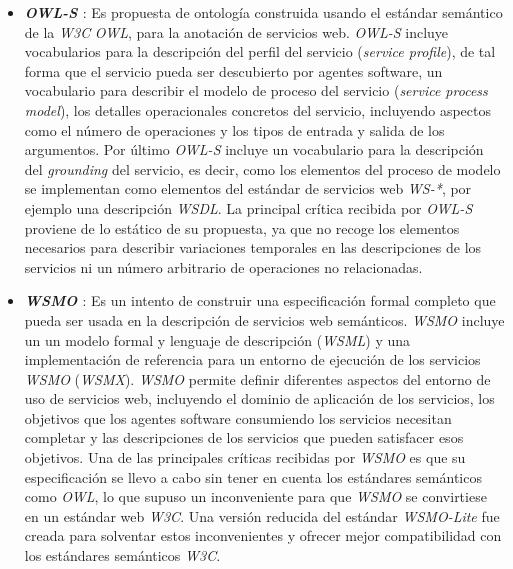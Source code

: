 \begin{itemize}

\item \textbf{\textit{OWL-S} \cite{martin2004owl}}: Es propuesta de ontolog\'ia construida usando el est\'andar sem\'antico de la \textit{W3C} \textit{OWL}, para la anotaci\'on de servicios web. \textit{OWL-S} incluye vocabularios para la descripci\'on del perfil del servicio (\textit{service profile}), de tal forma que el servicio pueda ser descubierto por agentes software, un vocabulario para describir el modelo de proceso del servicio (\textit{service process model}), los detalles operacionales concretos del servicio, incluyendo aspectos como el n\'umero de operaciones y los tipos de entrada y salida de los argumentos.  Por \'ultimo \textit{OWL-S} incluye un vocabulario para la descripci\'on del \textit{grounding} del servicio, es decir, como los elementos del proceso de modelo se implementan como elementos del est\'andar de servicios web \textit{WS-*}, por ejemplo una descripci\'on \textit{WSDL}. La principal cr\'itica recibida por \textit{OWL-S} proviene de lo est\'atico de su propuesta, ya que no recoge los elementos necesarios para describir variaciones temporales en las descripciones de los servicios ni un n\'umero arbitrario de operaciones no relacionadas.

\item \textbf{\textit{WSMO} \cite{wsmo}}: Es un intento de construir una especificaci\'on formal completo que pueda ser usada en la descripci\'on de servicios web sem\'anticos. \textit{WSMO} incluye un un modelo formal y lenguaje de descripci\'on (\textit{WSML}) y una implementaci\'on de referencia para un entorno de ejecuci\'on de los servicios \textit{WSMO} (\textit{WSMX}). \textit{WSMO} permite definir diferentes aspectos del entorno de uso de servicios web, incluyendo el dominio de aplicaci\'on de los servicios, los objetivos que los agentes software consumiendo los servicios necesitan completar y las descripciones de los servicios que pueden satisfacer esos objetivos. Una de las principales cr\'iticas recibidas por \textit{WSMO} es que su especificaci\'on se llevo a cabo sin tener en cuenta los est\'andares sem\'anticos como \textit{OWL}, lo que supuso un inconveniente para que \textit{WSMO} se convirtiese en un est\'andar web \textit{W3C}. Una versi\'on reducida del est\'andar \textit{WSMO-Lite} \cite{wsmo_lite} fue creada para solventar estos inconvenientes y ofrecer mejor compatibilidad con los est\'andares sem\'anticos \textit{W3C}.


\end{itemize}
